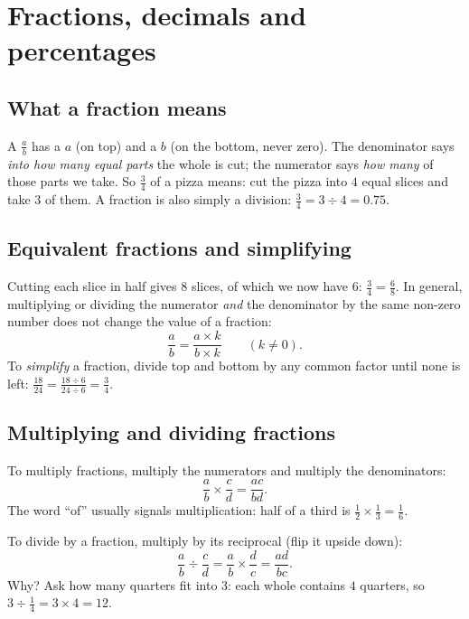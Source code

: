 \section{Fractions, decimals and percentages}\label{sec:fractions}

\subsection{What a fraction means}

A  $\tfrac{a}{b}$ has a  $a$ (on top) and a
 $b$ (on the bottom, never zero). The denominator says
\emph{into how many equal parts} the whole is cut; the numerator says
\emph{how many} of those parts we take. So $\tfrac34$ of a pizza means: cut the
pizza into $4$ equal slices and take $3$ of them. A fraction is also simply a
division: $\tfrac34 = 3 \div 4 = 0.75$.

\subsection{Equivalent fractions and simplifying}

Cutting each slice in half gives $8$ slices, of which we now have $6$:
$\tfrac34 = \tfrac68$. In general, multiplying or dividing the numerator
\emph{and} the denominator by the same non-zero number does not change the
value of a fraction:
\[
  \frac{a}{b} = \frac{a \times k}{b \times k} \qquad (k \neq 0).
\]
To \emph{simplify} a fraction, divide top and bottom by any common factor until
none is left: $\tfrac{18}{24} = \tfrac{18 \div 6}{24 \div 6} = \tfrac34$.

\subsection{Multiplying and dividing fractions}

To multiply fractions, multiply the numerators and multiply the
denominators:
\[
  \frac{a}{b}\times\frac{c}{d} = \frac{ac}{bd}.
\]
The word ``of'' usually signals multiplication: half of a third is
$\tfrac12 \times \tfrac13 = \tfrac16$.

To divide by a fraction, multiply by its reciprocal (flip it upside down):
\[
  \frac{a}{b} \div \frac{c}{d} = \frac{a}{b}\times\frac{d}{c} = \frac{ad}{bc}.
\]
Why? Ask how many quarters fit into $3$: each whole contains $4$ quarters, so
$3 \div \tfrac14 = 3 \times 4 = 12$.

